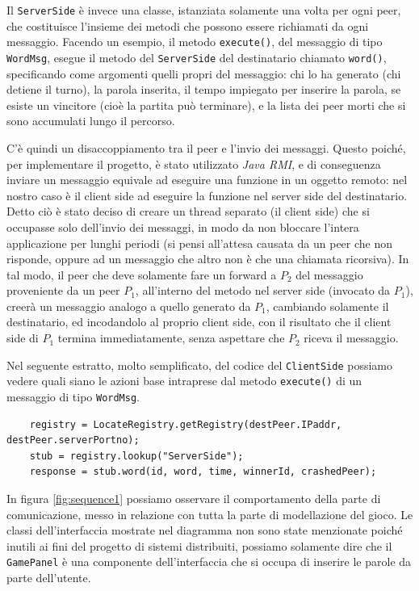 \documentclass[10.5pt]{article}
\begin{document}
Il \texttt{ServerSide} è invece una classe, istanziata solamente una volta per ogni peer, che costituisce l'insieme dei metodi che possono essere richiamati da ogni messaggio. Facendo un esempio, il metodo \texttt{execute()}, del messaggio di tipo \texttt{WordMsg}, esegue il metodo del \texttt{ServerSide} del destinatario chiamato \texttt{word()}, specificando come argomenti quelli propri del messaggio: chi lo ha generato (chi detiene il turno), la parola inserita, il tempo impiegato per inserire la parola, se esiste un vincitore (cioè la partita può terminare), e la lista dei peer morti che si sono accumulati lungo il percorso.

C'è quindi un disaccoppiamento tra il peer e l'invio dei messaggi. Questo poiché, per implementare il progetto, è stato utilizzato \textit{Java RMI}, e di conseguenza inviare un messaggio equivale ad eseguire una funzione in un oggetto remoto: nel nostro caso è il client side ad eseguire la funzione nel server side del destinatario. Detto ciò è stato deciso di creare un thread separato (il client side) che si occupasse solo dell'invio dei messaggi, in modo da non bloccare l'intera applicazione per lunghi periodi (si pensi all'attesa causata da un peer che non risponde, oppure ad un messaggio che altro non è che una chiamata ricorsiva). In tal modo, il peer che deve solamente fare un forward a $P_2$ del messaggio proveniente da un peer $P_1$, all'interno del metodo nel server side (invocato da $P_1$), creerà un messaggio analogo a quello generato da $P_1$, cambiando solamente il destinatario, ed incodandolo al proprio client side, con il risultato che il client side di $P_1$ termina immediatamente, senza aspettare che $P_2$ riceva il messaggio. 

Nel seguente estratto, molto semplificato, del codice del \texttt{ClientSide} possiamo vedere quali siano le azioni base intraprese dal metodo \texttt{execute()} di un messaggio di tipo \texttt{WordMsg}.
\begin{verbatim}
	registry = LocateRegistry.getRegistry(destPeer.IPaddr, destPeer.serverPortno);
	stub = registry.lookup("ServerSide");
	response = stub.word(id, word, time, winnerId, crashedPeer);
\end{verbatim}

In figura \ref{fig:sequence1} possiamo osservare il comportamento della parte di comunicazione, messo in relazione con tutta la parte di modellazione del gioco. Le classi dell'interfaccia mostrate nel diagramma non sono state menzionate poiché inutili ai fini del progetto di sistemi distribuiti, possiamo solamente dire che il \texttt{GamePanel} è una componente dell'interfaccia che si occupa di inserire le parole da parte dell'utente.
\end{document}
